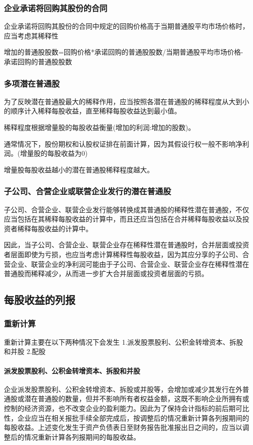\documentclass[UTF8,12pt]{ctexart}
\numberwithin{equation}{section} %
\numberwithin{figure}{section}
\numberwithin{table}{section}
\begin{document}
	\subsubsection{企业承诺将回购其股份的合同}
	企业承诺将回购其股份的合同中规定的回购价格高于当期普通股平均市场价格时，应当考虑其稀释性
	
	增加的普通股股数=回购价格*承诺回购的普通股股数/当期普通股平均市场价格-承诺回购的普通股股数
	
	\subsubsection{多项潜在普通股}
	为了反映潜在普通股最大的稀释作用，应当按照各潜在普通股的稀释程度从大到小的顺序计入稀释每股收益，直至稀释每股收益达到最小值。
	
	稀释程度根据增量股的每股收益衡量(增加的利润:增加的股数)。
	
	通常情况下，股份期权和认股权证排在前面计算，因为其假设行权一般不影响净利润。(增量股的每股收益为0)
	
	增量股每股收益越小的潜在普通股稀释程度越大。
	
	\subsubsection{子公司、合营企业或联营企业发行的潜在普通股}
	子公司、合营企业、联营企业发行能够转换成其普通股的稀释性潜在普通股，不仅应当包括在其稀释每股收益的计算中，而且还应当包括在合并稀释每股收益以及投资者稀释每股收益的计算中。
	
	因此，当子公司、合营企业、联营企业存在稀释性潜在普通股时，合并层面或投资者层面即使为亏损，也应当考虑计算稀释性每股收益，因为其应分享的子公司、合营企业、联营企业的净利润可能由于子公司、合营企业、联营企业存在稀释性潜在普通股而稀释减少，从而进一步扩大合并层面或投资者层面的亏损。
	
	\subsection{每股收益的列报}
	\subsubsection{重新计算}
	重新计算主要在以下两种情况下会发生
	1.派发股票股利、公积金转增资本、拆股和并股
	2.配股
	
	\paragraph{派发股票股利、公积金转增资本、拆股和并股}
	企业派发股票股利、公积金转增资本、拆股或并股等，会增加或减少其发行在外普通股或潜在普通股的数量，但并不影响所有者权益金额，这既不影响企业所拥有或控制的经济资源，也不改变企业的盈利能力。因此为了保持会计指标的前后期可比性，企业应当在相关报批手续全部完成后，按调整后的情况重新计算各列报期间的每股收益。上述变化发生于资产负债表日至财务报告批准报出日之间的，应当以调整后的情况重新计算各列报期间的每股收益。
	
\end{document}
